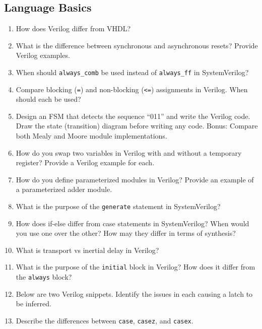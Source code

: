\documentclass[11pt]{article}
\begin{document}
\subsection{Language Basics}
\begin{enumerate}
    \item How does Verilog differ from VHDL?

    \item What is the difference between synchronous and asynchronous resets?
    Provide Verilog examples.

    \item When should \texttt{always\_comb} be used instead of
    \texttt{always\_ff} in SystemVerilog?

    \item Compare blocking (\verb|=|) and non-blocking (\verb|<=|) assignments
    in Verilog. When should each be used?

    \item Design an FSM that detects the sequence “011” and write the Verilog
    code. Draw the state (transition) diagram before writing any code. Bonus:
    Compare both Mealy and Moore module implementations.
    \item How do you swap two variables in Verilog with and without a temporary
    register? Provide a Verilog example for each.
    \item How do you define parameterized modules in Verilog? Provide an
    example of a parameterized adder module.
    \item What is the purpose of the \texttt{generate} statement in SystemVerilog?
    \item How does if-else differ from case statements in SystemVerilog? When would you
    use one over the other? How may they differ in terms of synthesis?
    \item What is transport vs inertial delay in Verilog?
    \item What is the purpose of the \texttt{initial} block in Verilog? How does it differ from the
    \texttt{always} block?

    \item Below are two Verilog snippets. Identify the issues in each causing a
    latch to be inferred.
    

    \item Describe the differences between \texttt{case}, \texttt{casez}, and
    \texttt{casex}.


\end{enumerate}
\end{document}
